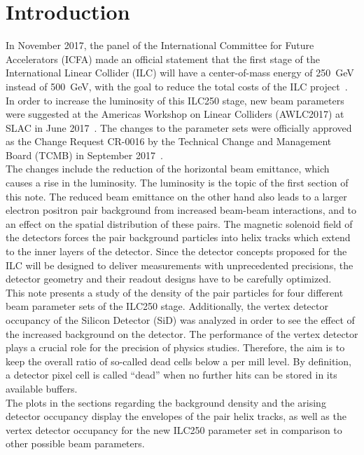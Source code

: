 \documentclass[12pt]{article}
\begin{document}
\section{Introduction}
\label{sec:introduction}
In November 2017, the panel of the International Committee for Future Accelerators (ICFA) made an official statement that the first stage of the International Linear Collider (ILC) will have a center-of-mass energy of \SI{250}{\GeV} instead of \SI{500}{\GeV}, with the goal to reduce the total costs of the ILC project~\cite{ICFA_Statement}.
In order to increase the luminosity of this ILC250 stage, new beam parameters were suggested at the Americas Workshop on Linear Colliders (AWLC2017) at SLAC in June 2017~\cite{AWLC_Yokoya, AWLC_Jeans}.
The changes to the parameter sets were officially approved as the Change Request CR-0016 by the Technical Change and Management Board (TCMB) in September 2017~\cite{CR-0016}.\\
The changes include the reduction of the horizontal beam emittance, which causes a rise in the luminosity.
The luminosity is the topic of the first section of this note.
The reduced beam emittance on the other hand also leads to a larger electron positron pair background from increased beam-beam interactions, and to an effect on the spatial distribution of these pairs.
The magnetic solenoid field of the detectors forces the pair background particles into helix tracks which extend to the inner layers of the detector.
Since the detector concepts proposed for the ILC will be designed to deliver measurements with unprecedented precisions, the detector geometry and their readout designs have to be carefully optimized.\\
This note presents a study of the density of the \Pep\Pem pair particles for four different beam parameter sets of the ILC250 stage.
Additionally, the vertex detector occupancy of the Silicon Detector (SiD) was analyzed in order to see the effect of the increased background on the detector.  
The performance of the vertex detector plays a crucial role for the precision of physics studies.
Therefore, the aim is to keep the overall ratio of so-called dead cells below a per mill level.
By definition, a detector pixel cell is called ``dead'' when no further hits can be stored in its available buffers.\\
The plots in the sections regarding the background density and the arising detector occupancy display the envelopes of the pair helix tracks, as well as the vertex detector occupancy for the new ILC250 parameter set in comparison to other possible beam parameters.
\end{document}
